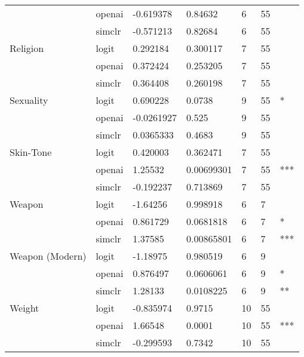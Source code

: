 \begin{tabular}{lllllll}
       & openai &  -0.619378 &     0.84632 &   6 &  55 &      \\
       & simclr &  -0.571213 &     0.82684 &   6 &  55 &      \\
Religion & logit &   0.292184 &    0.300117 &   7 &  55 &      \\
       & openai &   0.372424 &    0.253205 &   7 &  55 &      \\
       & simclr &   0.364408 &    0.260198 &   7 &  55 &      \\
Sexuality & logit &   0.690228 &      0.0738 &   9 &  55 &    * \\
       & openai & -0.0261927 &       0.525 &   9 &  55 &      \\
       & simclr &  0.0365333 &      0.4683 &   9 &  55 &      \\
Skin-Tone & logit &   0.420003 &    0.362471 &   7 &  55 &      \\
       & openai &    1.25532 &  0.00699301 &   7 &  55 &  *** \\
       & simclr &  -0.192237 &    0.713869 &   7 &  55 &      \\
Weapon & logit &   -1.64256 &    0.998918 &   6 &   7 &      \\
       & openai &   0.861729 &   0.0681818 &   6 &   7 &    * \\
       & simclr &    1.37585 &  0.00865801 &   6 &   7 &  *** \\
Weapon (Modern) & logit &   -1.18975 &    0.980519 &   6 &   9 &      \\
       & openai &   0.876497 &   0.0606061 &   6 &   9 &    * \\
       & simclr &    1.28133 &   0.0108225 &   6 &   9 &   ** \\
Weight & logit &  -0.835974 &      0.9715 &  10 &  55 &      \\
       & openai &    1.66548 &      0.0001 &  10 &  55 &  *** \\
       & simclr &  -0.299593 &      0.7342 &  10 &  55 &      \\
\bottomrule
\end{tabular}
